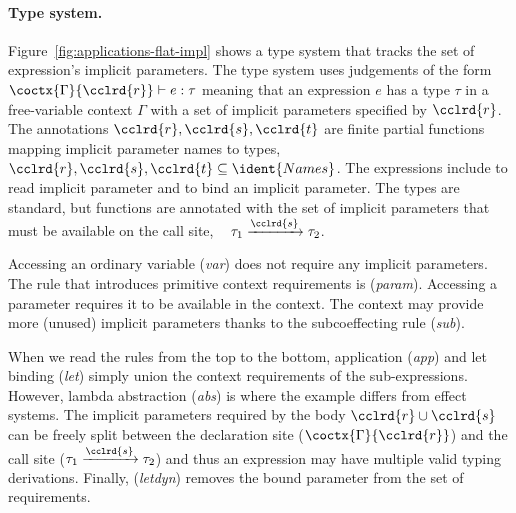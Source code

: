 \paragraph{Type system.}

Figure~\ref{fig:applications-flat-impl} shows a type system that tracks the set of expression's
implicit parameters. The type system uses judgements of the form $\coctx{\Gamma}{\cclrd{r}} \vdash e : \tau$
meaning that an expression $e$ has a type $\tau$ in a free-variable context $\Gamma$ with a set
of implicit parameters specified by $\cclrd{r}$. The annotations $\cclrd{r},\cclrd{s},\cclrd{t}$ are
finite partial functions mapping implicit parameter names to types, \ie~$\cclrd{r},\cclrd{s},\cclrd{t} \subseteq
\ident{Names}$. The expressions include  to read implicit
parameter and  to bind an implicit parameter. The types are standard, but functions are
annotated with the set of implicit parameters that must be available on the call site, \ie~
$\tau_1 \xrightarrow{\cclrd{s}} \tau_2$.

Accessing an ordinary variable (\emph{var}) does not require any implicit parameters. The rule that
introduces primitive context requirements is (\emph{param}). Accessing a parameter 
requires it to be available in the context. The context may provide more (unused)
implicit parameters thanks to the subcoeffecting rule (\emph{sub}).

When we read the rules from the top to the bottom, application (\emph{app}) and let binding
(\emph{let}) simply union the context requirements of the sub-expressions. However, lambda abstraction
(\emph{abs}) is where the example differs from effect systems. The implicit parameters required by
the body $\cclrd{r} \cup \cclrd{s}$ can be freely split between the declaration site ($\coctx{\Gamma}{\cclrd{r}}$)
and the call site ($\tau_1 \xrightarrow{\cclrd{s}} \tau_2$) and thus an expression may have multiple
valid typing derivations. Finally, (\emph{letdyn}) removes the bound parameter from the set of requirements.

